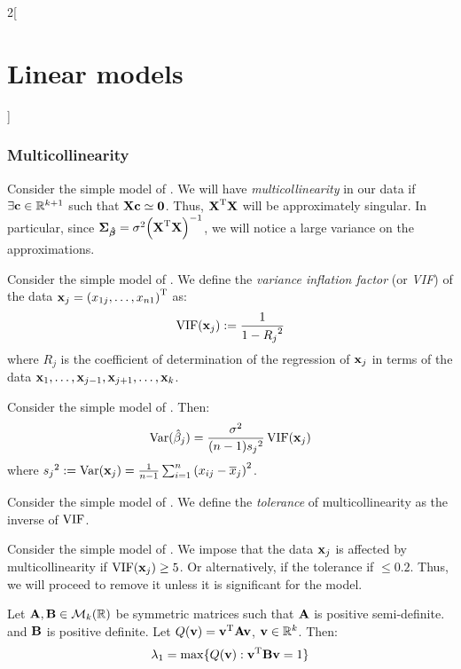 \documentclass[../../../main_math.tex]{subfiles}
\begin{document}
\begin{multicols}{2}[\section{Linear models}]
  \subsubsection{Multicollinearity}
  \begin{definition}
    Consider the simple model of . We will have \emph{multicollinearity} in our data if $\exists \boldsymbol{\mathrm{c}}\in\mathbb{R}^{k+1}$ such that $\boldsymbol{\mathrm{Xc}}\simeq \boldsymbol{\mathrm{0}}$. Thus, ${\boldsymbol{\mathrm{X}}}^{\mathrm{T}}\boldsymbol{\mathrm{X}}$ will be approximately singular. In particular, since $\boldsymbol{\mathrm{\Sigma}}_{\boldsymbol{\mathrm{\hat\beta}}}=\sigma^2{\left({\boldsymbol{\mathrm{X}}}^{\mathrm{T}}\boldsymbol{\mathrm{X}}\right)}^{-1}$, we will notice a large variance on the approximations.
  \end{definition}
  \begin{definition}
    Consider the simple model of . We define the \emph{variance inflation factor} (or \emph{VIF}) of the data $\boldsymbol{\mathrm{x}}_j={(x_{1j},\ldots,x_{n1})}^{\mathrm{T}}$ as: $$\operatorname{VIF}(\boldsymbol{\mathrm{x}}_j):=\frac{1}{1-{R_j}^2}$$ where ${R_j}$ is the coefficient of determination of the regression of $\boldsymbol{\mathrm{x}}_j$ in terms of the data $\boldsymbol{\mathrm{x}}_1,\ldots,\boldsymbol{\mathrm{x}}_{j-1},\boldsymbol{\mathrm{x}}_{j+1},\ldots,\boldsymbol{\mathrm{x}}_k$.
  \end{definition}
  \begin{lemma}
    Consider the simple model of . Then: $$\mathrm{Var}(\hat\beta_j)=\frac{\sigma^2}{(n-1) {s_j}^2}\operatorname{VIF}(\boldsymbol{\mathrm{x}}_j)$$ where ${s_j}^2:=\mathrm{Var}(\boldsymbol{\mathrm{x}}_j)=\frac{1}{n-1}\sum_{i=1}^n{(x_{ij}-\overline{x}_j)}^2$.
  \end{lemma}
  \begin{definition}
    Consider the simple model of . We define the \emph{tolerance} of multicollinearity as the inverse of $\operatorname{VIF}$.
  \end{definition}
  \begin{definition}
    Consider the simple model of .  We impose that the data $\boldsymbol{\mathrm{x}}_j$ is affected by multicollinearity if $\operatorname{VIF}(\boldsymbol{\mathrm{x}}_j)\ge 5$. Or alternatively, if the tolerance if $\leq 0.2$. Thus, we will proceed to remove it unless it is significant for the model.
  \end{definition}
  \begin{theorem}
    Let $\boldsymbol{\mathrm{A}},\boldsymbol{\mathrm{B}}\in\mathcal{M}_k(\mathbb{R})$ be symmetric matrices such that $\boldsymbol{\mathrm{A}}$ is positive semi-definite. and $\boldsymbol{\mathrm{B}}$ is positive definite. Let $Q(\boldsymbol{\mathrm{v}})={\boldsymbol{\mathrm{v}}}^{\mathrm{T}}\boldsymbol{\mathrm{Av}}$, $\boldsymbol{\mathrm{v}}\in\mathbb{R}^k$. Then:
    \begin{align*}
      \lambda_1 & =\max\{Q(\vf{v}):\transpose{\vf{v}}\vf{Bv}=1\}    \\

\end{align*}
\end{theorem}
\end{multicols}
\end{document}
